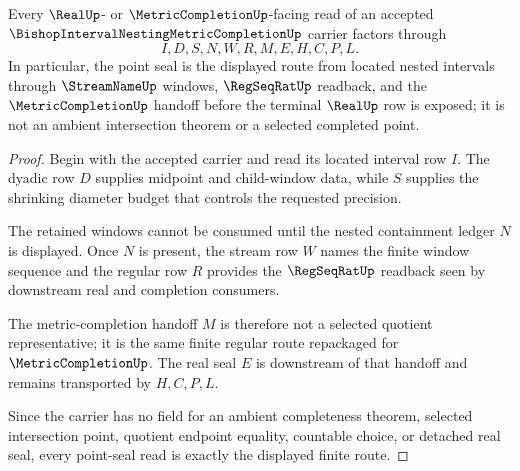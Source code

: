 \begin{theorem}
\label{thm:bishop-interval-nesting-metric-completion-point-seal}
Every $\RealUp$- or $\MetricCompletionUp$-facing read of an accepted $\BishopIntervalNestingMetricCompletionUp$ carrier factors through
$$
I,D,S,N,W,R,M,E,H,C,P,L.
$$
In particular, the point seal is the displayed route from located nested intervals through $\StreamNameUp$ windows, $\RegSeqRatUp$ readback, and the $\MetricCompletionUp$ handoff before the terminal $\RealUp$ row is exposed; it is not an ambient intersection theorem or a selected completed point.
\end{theorem}
\begin{proof}
Begin with the accepted carrier and read its located interval row $I$. The dyadic row $D$ supplies midpoint and child-window data, while $S$ supplies the shrinking diameter budget that controls the requested precision.

The retained windows cannot be consumed until the nested containment ledger $N$ is displayed. Once $N$ is present, the stream row $W$ names the finite window sequence and the regular row $R$ provides the $\RegSeqRatUp$ readback seen by downstream real and completion consumers.

The metric-completion handoff $M$ is therefore not a selected quotient representative; it is the same finite regular route repackaged for $\MetricCompletionUp$. The real seal $E$ is downstream of that handoff and remains transported by $H,C,P,L$.

Since the carrier has no field for an ambient completeness theorem, selected intersection point, quotient endpoint equality, countable choice, or detached real seal, every point-seal read is exactly the displayed finite route.
\end{proof}


